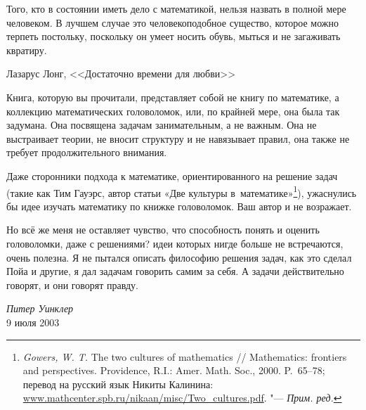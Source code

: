 \documentclass[twoside]{book}
\begin{document}
\setlength{\epigraphwidth}{.6\textwidth}
\epigraph{Того, кто в состоянии иметь дело с математикой, нельзя назвать в полной мере человеком. В лучшем случае это человекоподобное существо, которое можно терпеть постольку, поскольку он умеет носить обувь, мыться и не загаживать квратиру.\vspace{1ex}}{Лазарус Лонг, <<Достаточно времени для любви>>
}


Книга, которую вы прочитали, представляет собой не книгу по
математике, а коллекцию математических головоломок, или, по крайней
мере, она была так задумана.
Она посвящена задачам занимательным, а
не важным.
Она не выстраивает теории, не вносит структуру и не
навязывает правил, она также не требует продолжительного внимания.

Даже сторонники подхода к математике, ориентированного на решение
задач (такие как Тим Гауэрс, автор статьи «Две культуры в~математике»\footnote{\emph{Gowers, W. T.} The two cultures of mathematics /\!/ {Mathematics: frontiers and per\-spec\-tives.} Providence, R.I.: Amer. Math. Soc., 2000. P.~65--78; перевод на русский язык Никиты Калинина:
\href{http://www.mathcenter.spb.ru/nikaan/misc/Two_cultures.pdf}{\url{www.mathcenter.spb.ru/nikaan/misc/Two_cultures.pdf}}. "---
\emph{Прим. ред.}}), ужаснулись бы идее изучать математику по
книжке головоломок.
Ваш автор и не возражает.

Но всё же меня не оставляет чувство, что способность понять и оценить
головоломки, даже с решениями? идеи которых нигде больше не
встречаются, очень полезна.
Я не пытался описать философию решения
задач, как это сделал Пойа и другие, я дал задачам говорить самим за
себя.
А задачи действительно говорят, и они говорят \mbox{правду}.

\begin{flushright}
\emph{Питер Уинклер}
\\
9 июля 2003
\end{flushright}

{
\small

\printindex

}




\tableofcontents

\thispagestyle{empty}
\end{document}
